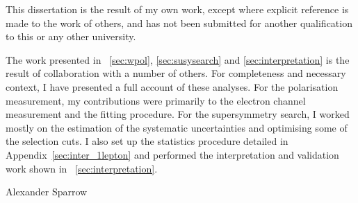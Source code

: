 \begin{declaration}
  This dissertation is the result of my own work, except where explicit
  reference is made to the work of others, and has not been submitted
  for another qualification to this or any other university.

  The work presented in \chaps~\ref{sec:wpol}, \ref{sec:susysearch} and
  \ref{sec:interpretation} is the result of collaboration with a number of
  others. For completeness and necessary context, I have presented a full
  account of these analyses. For the \PW polarisation measurement, my
  contributions were primarily to the electron channel measurement and the
  fitting procedure. For the supersymmetry search, I worked mostly on the
  estimation of the systematic uncertainties and optimising some of the
  selection cuts. I also set up the statistics procedure detailed in
  Appendix~\ref{sec:inter_1lepton} and performed the interpretation and
  validation work shown in \chap~\ref{sec:interpretation}.

  \vspace*{1cm}
  \begin{flushright}
    Alexander Sparrow
  \end{flushright}
\end{declaration}


